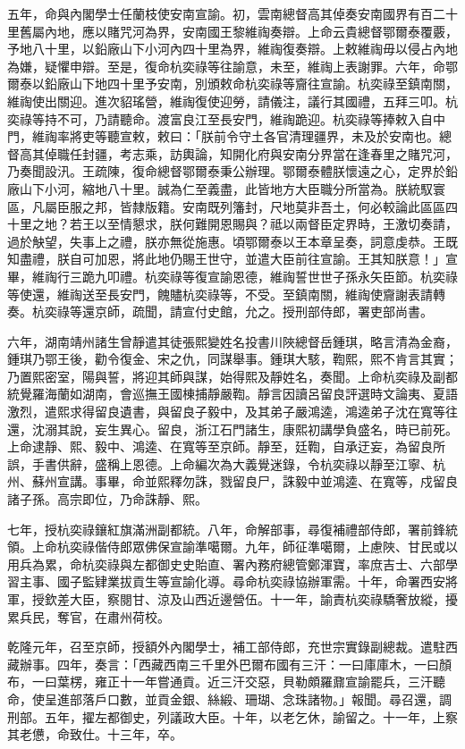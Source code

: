 \begin{pinyinscope}
五年，命與內閣學士任蘭枝使安南宣諭。初，雲南總督高其倬奏安南國界有百二十里舊屬內地，應以賭咒河為界，安南國王黎維祹奏辯。上命云貴總督鄂爾泰覆覈，予地八十里，以鉛廠山下小河內四十里為界，維祹復奏辯。上敕維祹毋以侵占內地為嫌，疑懼申辯。至是，復命杭奕祿等往諭意，未至，維祹上表謝罪。六年，命鄂爾泰以鉛廠山下地四十里予安南，別頒敕命杭奕祿等齎往宣諭。杭奕祿至鎮南關，維祹使出關迎。進次貂瑤營，維祹復使迎勞，請儀注，議行其國禮，五拜三叩。杭奕祿等持不可，乃請聽命。渡富良江至長安門，維祹跪迎。杭奕祿等捧敕入自中門，維祹率將吏等聽宣敕，敕曰：「朕前令守土各官清理疆界，未及於安南也。總督高其倬職任封疆，考志乘，訪輿論，知開化府與安南分界當在逢春里之賭咒河，乃奏聞設汛。王疏陳，復命總督鄂爾泰秉公辦理。鄂爾泰體朕懷遠之心，定界於鉛廠山下小河，縮地八十里。誠為仁至義盡，此皆地方大臣職分所當為。朕統馭寰區，凡屬臣服之邦，皆隸版籍。安南既列籓封，尺地莫非吾土，何必較論此區區四十里之地？若王以至情懇求，朕何難開恩賜與？祗以兩督臣定界時，王激切奏請，過於觖望，失事上之禮，朕亦無從施惠。頃鄂爾泰以王本章呈奏，詞意虔恭。王既知盡禮，朕自可加恩，將此地仍賜王世守，並遣大臣前往宣諭。王其知朕意！」宣畢，維祹行三跪九叩禮。杭奕祿等復宣諭恩德，維祹誓世世子孫永矢臣節。杭奕祿等使還，維祹送至長安門，餽贐杭奕祿等，不受。至鎮南關，維祹使齎謝表請轉奏。杭奕祿等還京師，疏聞，請宣付史館，允之。授刑部侍郎，署吏部尚書。

六年，湖南靖州諸生曾靜遣其徒張熙變姓名投書川陜總督岳鍾琪，略言清為金裔，鍾琪乃鄂王後，勸令復金、宋之仇，同謀舉事。鍾琪大駭，鞫熙，熙不肯言其實；乃置熙密室，陽與誓，將迎其師與謀，始得熙及靜姓名，奏聞。上命杭奕祿及副都統覺羅海蘭如湖南，會巡撫王國棟捕靜嚴鞫。靜言因讀呂留良評選時文論夷、夏語激烈，遣熙求得留良遺書，與留良子毅中，及其弟子嚴鴻逵，鴻逵弟子沈在寬等往還，沈溺其說，妄生異心。留良，浙江石門諸生，康熙初講學負盛名，時已前死。上命逮靜、熙、毅中、鴻逵、在寬等至京師。靜至，廷鞫，自承迂妄，為留良所誤，手書供辭，盛稱上恩德。上命編次為大義覺迷錄，令杭奕祿以靜至江寧、杭州、蘇州宣講。事畢，命並熙釋勿誅，戮留良尸，誅毅中並鴻逵、在寬等，戍留良諸子孫。高宗即位，乃命誅靜、熙。

七年，授杭奕祿鑲紅旗滿洲副都統。八年，命解部事，尋復補禮部侍郎，署前鋒統領。上命杭奕祿偕侍郎眾佛保宣諭準噶爾。九年，師征準噶爾，上慮陜、甘民或以用兵為累，命杭奕祿與左都御史史貽直、署內務府總管鄭渾寶，率庶吉士、六部學習主事、國子監肄業拔貢生等宣諭化導。尋命杭奕祿協辦軍需。十年，命署西安將軍，授欽差大臣，察閱甘、涼及山西近邊營伍。十一年，諭責杭奕祿驕奢放縱，擾累兵民，奪官，在肅州荷校。

乾隆元年，召至京師，授額外內閣學士，補工部侍郎，充世宗實錄副總裁。遣駐西藏辦事。四年，奏言：「西藏西南三千里外巴爾布國有三汗：一曰庫庫木，一曰顏布，一曰葉楞，雍正十一年嘗通貢。近三汗交惡，貝勒頗羅鼐宣諭罷兵，三汗聽命，使呈進部落戶口數，並貢金銀、絲緞、珊瑚、念珠諸物。」報聞。尋召還，調刑部。五年，擢左都御史，列議政大臣。十年，以老乞休，諭留之。十一年，上察其老憊，命致仕。十三年，卒。


\end{pinyinscope}

